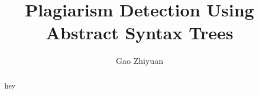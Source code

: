 \documentclass{article}
\title{Plagiarism Detection Using Abstract Syntax Trees}
\author{Gao Zhiyuan}
\begin{document}
\maketitle

\begin{abstract}
hey
\end{abstract}
\end{document}
